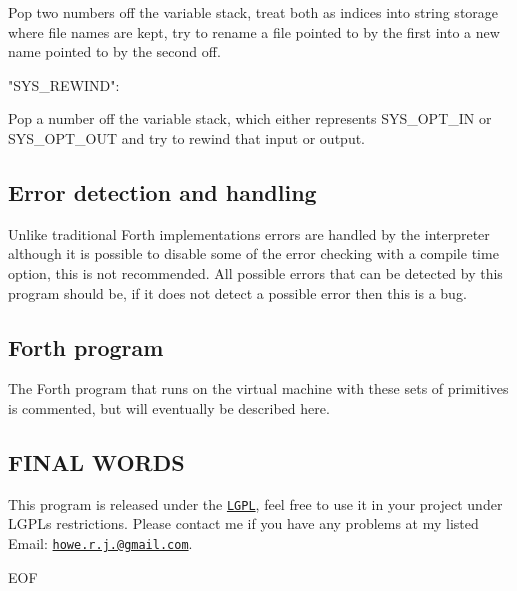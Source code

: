 Pop two numbers off the variable stack, treat both as indices into string storage where file names are kept, try to rename a file pointed to by the first into a new name pointed to by the second off. \begin{DoxyVerb}   "SYS_REWIND":
\end{DoxyVerb}


Pop a number off the variable stack, which either represents S\-Y\-S\-\_\-\-O\-P\-T\-\_\-\-I\-N or S\-Y\-S\-\_\-\-O\-P\-T\-\_\-\-O\-U\-T and try to rewind that input or output.

\subsection*{Error detection and handling}

Unlike traditional Forth implementations errors are handled by the interpreter although it is possible to disable some of the error checking with a compile time option, this is not recommended. All possible errors that can be detected by this program should be, if it does not detect a possible error then this is a bug.

\subsection*{Forth program}

The Forth program that runs on the virtual machine with these sets of primitives is commented, but will eventually be described here.

\subsection*{F\-I\-N\-A\-L W\-O\-R\-D\-S}

This program is released under the \href{http://www.gnu.org/licenses/lgpl-3.0.txt}{\tt L\-G\-P\-L}, feel free to use it in your project under L\-G\-P\-Ls restrictions. Please contact me if you have any problems at my listed Email\-: \href{mailto:howe.r.j.89@gmail.com}{\tt howe.\-r.\-j.@gmail.\-com}.

E\-O\-F 